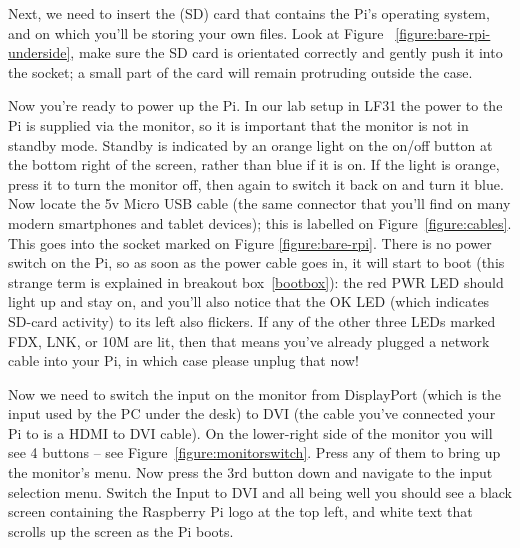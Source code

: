 Next, we need to insert the  (SD) card that contains the Pi's operating system, and on which you'll be storing your own files. Look at Figure ~\ref{figure:bare-rpi-underside}, make sure the SD card is orientated correctly and gently push it into the socket; a small part of the card will remain protruding outside the case.


Now you're ready to power up the Pi. In our lab setup in LF31 the power to the Pi is supplied via the monitor, so it is important that the monitor is not in standby mode. Standby is indicated by an orange light on the on/off button at the bottom right of the screen, rather than blue if it is on. If the light is orange, press it to turn the monitor off, then again to switch it back on and turn it blue. Now locate the 5v Micro USB cable (the same connector that you'll find on many modern smartphones and tablet devices); this is labelled \protect{} on Figure~\ref{figure:cables}. This goes into the socket marked  on Figure \ref{figure:bare-rpi}. There is no power switch on the Pi, so as soon as the power cable goes in, it will start to boot (this strange term is explained in breakout box~\ref{bootbox}): the red PWR LED should light up and stay on, and you'll also notice that the OK LED (which indicates SD-card activity) to its left also flickers. If any of the other three LEDs marked FDX, LNK, or 10M are lit, then that means you've already plugged a network cable into your Pi, in which case please unplug that now!




Now we need to switch the input on the monitor from DisplayPort (which
is the input used by the PC under the desk) to DVI (the cable you've
connected your Pi to is a HDMI to DVI cable). On the lower-right side
of the monitor you will see 4 buttons -- see
Figure~\ref{figure:monitorswitch}. Press any of them to bring up the
monitor's menu. Now press the 3rd button down and navigate to the
input selection menu. Switch the Input to DVI and all being well you
should see a black screen containing the Raspberry Pi logo at the top
left, and white text that scrolls up the screen as the Pi boots.

